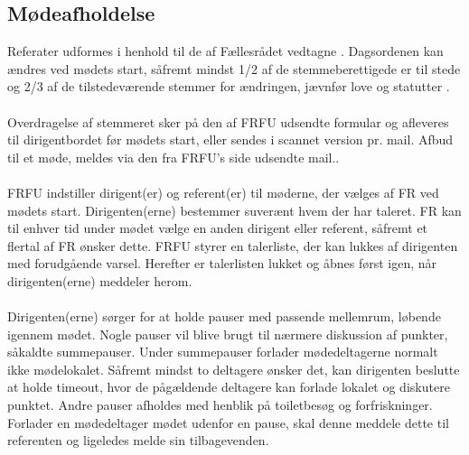 \subsection{Mødeafholdelse}
Referater udformes i henhold til de af Fællesrådet vedtagne . Dagsordenen kan ændres ved mødets start, såfremt mindst 1/2 af de stemmeberettigede er til stede og 2/3 af de tilstedeværende stemmer for ændringen, jævnfør love og statutter .
\\
\\
Overdragelse af stemmeret sker på den af FRFU udsendte formular og afleveres til dirigentbordet før mødets start, eller sendes i scannet version pr. mail. Afbud til et møde, meldes via den fra FRFU’s side udsendte mail..
\\
\\
FRFU indstiller dirigent(er) og referent(er) til møderne, der vælges af FR ved mødets start. Dirigenten(erne) bestemmer
suverænt hvem der har taleret. FR kan til enhver tid under mødet vælge en anden dirigent eller referent, såfremt et
flertal af FR ønsker dette. FRFU styrer en talerliste, der kan lukkes af dirigenten med forudgående varsel. Herefter er
talerlisten lukket og åbnes først igen, når dirigenten(erne) meddeler herom.
\\
\\
Dirigenten(erne) sørger for at holde pauser med passende mellemrum, løbende igennem mødet. Nogle pauser vil blive
brugt til nærmere diskussion af punkter, såkaldte summepauser. Under summepauser forlader mødedeltagerne normalt
ikke mødelokalet. Såfremt mindst to deltagere ønsker det, kan dirigenten beslutte at holde timeout, hvor de pågældende
deltagere kan forlade lokalet og diskutere punktet. Andre pauser afholdes med henblik på toiletbesøg og forfriskninger.
Forlader en mødedeltager mødet udenfor en pause, skal denne meddele dette til referenten og ligeledes melde sin
tilbagevenden.


